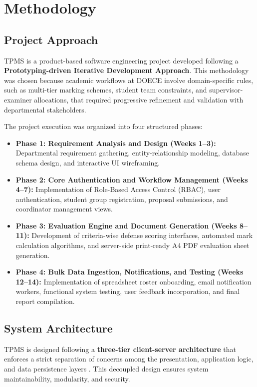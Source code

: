 \chapter{Methodology}

\section{Project Approach}
TPMS is a product-based software engineering project developed following a \textbf{Prototyping-driven Iterative Development Approach}. This methodology was chosen because academic workflows at DOECE involve domain-specific rules, such as multi-tier marking schemes, student team constraints, and supervisor-examiner allocations, that required progressive refinement and validation with departmental stakeholders.

The project execution was organized into four structured phases:
\begin{itemize}
  \item \textbf{Phase 1: Requirement Analysis and Design (Weeks 1--3):} Departmental requirement gathering, entity-relationship modeling, database schema design, and interactive UI wireframing.
  
  \item \textbf{Phase 2: Core Authentication and Workflow Management (Weeks 4--7):} Implementation of Role-Based Access Control (RBAC), user authentication, student group registration, proposal submissions, and coordinator management views.
  
  \item \textbf{Phase 3: Evaluation Engine and Document Generation (Weeks 8--11):} Development of criteria-wise defense scoring interfaces, automated mark calculation algorithms, and server-side print-ready A4 PDF evaluation sheet generation.
  
  \item \textbf{Phase 4: Bulk Data Ingestion, Notifications, and Testing (Weeks 12--14):} Implementation of spreadsheet roster onboarding, email notification workers, functional system testing, user feedback incorporation, and final report compilation.
\end{itemize}

\section{System Architecture}
TPMS is designed following a \textbf{three-tier client-server architecture} that enforces a strict separation of concerns among the presentation, application logic, and data persistence layers \cite{martin2017clean}. This decoupled design ensures system maintainability, modularity, and security.

